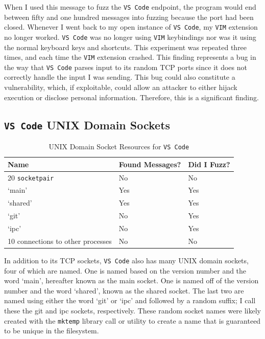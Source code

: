When I used this message to fuzz the \texttt{VS Code} endpoint, the program would end between fifty and one hundred messages into fuzzing because the port had been closed.  Whenever I went back to my open instance of \texttt{VS Code}, my \texttt{VIM} extension no longer worked.  \texttt{VS Code} was no longer using \texttt{VIM} keybindings nor was it using the normal keyboard keys and shortcuts.  This experiment was repeated three times, and each time the \texttt{VIM} extension crashed.  This finding represents a bug in the way that \texttt{VS Code} parses input to its random TCP ports since it does not correctly handle the input I was sending.  This bug could also constitute a vulnerability, which, if exploitable, could allow an attacker to either hijack execution or disclose personal information.  Therefore, this is a significant finding.

\subsection{\texttt{VS Code} UNIX Domain Sockets}
\label{sec:codeUnix}

\begin{table}
\centering
\begin{normalsize}
\begin{tabular}{ l | l | l }
\textbf{Name} & \textbf{Found Messages?} & \textbf{Did I Fuzz?} \\ \hline
20 \texttt{socketpair} & No & No \\ \hline
`main' & Yes & Yes \\ \hline
`shared' & Yes & Yes \\ \hline
`git' & No & Yes \\ \hline
`ipc' & No & Yes \\ \hline
10 connections to other processes & No & No \\ \hline
\end{tabular}
\caption{UNIX Domain Socket Resources for \texttt{VS Code}}
\label{tab:vsCodeUnixTab}
\end{normalsize}
\end{table} 

In addition to its TCP sockets, \texttt{VS Code} also has many UNIX domain sockets,  four of which are named.  One is named based on the version number and the word `main', hereafter known as the main socket.  One is named off of the version number and the word `shared', known as the shared socket.  The last two are named using either the word `git' or `ipc' and followed by a random suffix; I call these the git and ipc sockets, respectively.  These random socket names were likely created with the \texttt{mktemp} library call or utility to create a name that is guaranteed to be unique in the filesystem.

